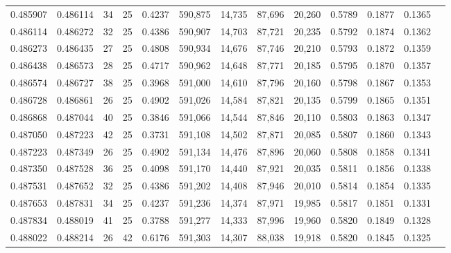 \begin{tabular}{rrrrrrrrrrrrr}
0.485907 & 0.486114 &    34 &  25 &                                     0.4237 & 590,875 &  14,735 &  87,696 &  20,260 & 0.5789 & 0.1877 & 0.1365 \\
0.486114 & 0.486272 &    32 &  25 &                                     0.4386 & 590,907 &  14,703 &  87,721 &  20,235 & 0.5792 & 0.1874 & 0.1362 \\
0.486273 & 0.486435 &    27 &  25 &                                     0.4808 & 590,934 &  14,676 &  87,746 &  20,210 & 0.5793 & 0.1872 & 0.1359 \\
0.486438 & 0.486573 &    28 &  25 &                                     0.4717 & 590,962 &  14,648 &  87,771 &  20,185 & 0.5795 & 0.1870 & 0.1357 \\
0.486574 & 0.486727 &    38 &  25 &                                     0.3968 & 591,000 &  14,610 &  87,796 &  20,160 & 0.5798 & 0.1867 & 0.1353 \\
0.486728 & 0.486861 &    26 &  25 &                                     0.4902 & 591,026 &  14,584 &  87,821 &  20,135 & 0.5799 & 0.1865 & 0.1351 \\
0.486868 & 0.487044 &    40 &  25 &                                     0.3846 & 591,066 &  14,544 &  87,846 &  20,110 & 0.5803 & 0.1863 & 0.1347 \\
0.487050 & 0.487223 &    42 &  25 &                                     0.3731 & 591,108 &  14,502 &  87,871 &  20,085 & 0.5807 & 0.1860 & 0.1343 \\
0.487223 & 0.487349 &    26 &  25 &                                     0.4902 & 591,134 &  14,476 &  87,896 &  20,060 & 0.5808 & 0.1858 & 0.1341 \\
0.487350 & 0.487528 &    36 &  25 &                                     0.4098 & 591,170 &  14,440 &  87,921 &  20,035 & 0.5811 & 0.1856 & 0.1338 \\
0.487531 & 0.487652 &    32 &  25 &                                     0.4386 & 591,202 &  14,408 &  87,946 &  20,010 & 0.5814 & 0.1854 & 0.1335 \\
0.487653 & 0.487831 &    34 &  25 &                                     0.4237 & 591,236 &  14,374 &  87,971 &  19,985 & 0.5817 & 0.1851 & 0.1331 \\
0.487834 & 0.488019 &    41 &  25 &                                     0.3788 & 591,277 &  14,333 &  87,996 &  19,960 & 0.5820 & 0.1849 & 0.1328 \\
0.488022 & 0.488214 &    26 &  42 &                                     0.6176 & 591,303 &  14,307 &  88,038 &  19,918 & 0.5820 & 0.1845 & 0.1325 \\

\end{tabular}
